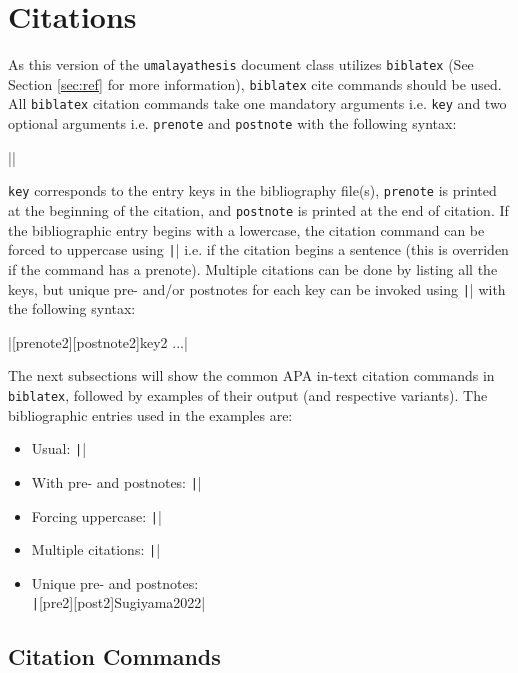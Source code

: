 \documentclass{umalayathesis}
\begin{document}
\section{Citations}

As this version of the \texttt{umalayathesis} document class utilizes \texttt{biblatex} (See Section \ref{sec:ref} for more information), \texttt{biblatex} cite commands should be used. All \texttt{biblatex} citation commands take one mandatory arguments i.e. \texttt{key} and two optional arguments i.e. \texttt{prenote} and \texttt{postnote} with the following syntax:

||

\texttt{key} corresponds to the entry keys in the bibliography file(s), \texttt{prenote} is printed at the beginning of the citation, and \texttt{postnote} is printed at the end of citation. If the bibliographic entry begins with a lowercase, the citation command can be forced to uppercase using \texttt|\Command| i.e. if the citation begins a sentence (this is overriden if the command has a prenote). Multiple citations can be done by listing all the keys, but unique pre- and/or postnotes for each key can be invoked using \texttt|\commands| with the following syntax:

|[prenote2][postnote2]{key2} ...|

The next subsections will show the common APA in-text citation commands in \texttt{biblatex}, followed by examples of their output (and respective variants). The bibliographic entries used in the examples are:

\begin{itemize}
    \item Usual: \texttt||
    \item With pre- and postnotes: \texttt||
    \item Forcing uppercase: \texttt||
    \item Multiple citations: \texttt||
    \item Unique pre- and postnotes: \\ \texttt|[pre2][post2]{Sugiyama2022}|
\end{itemize}

\subsection{Citation Commands}
\end{document}
